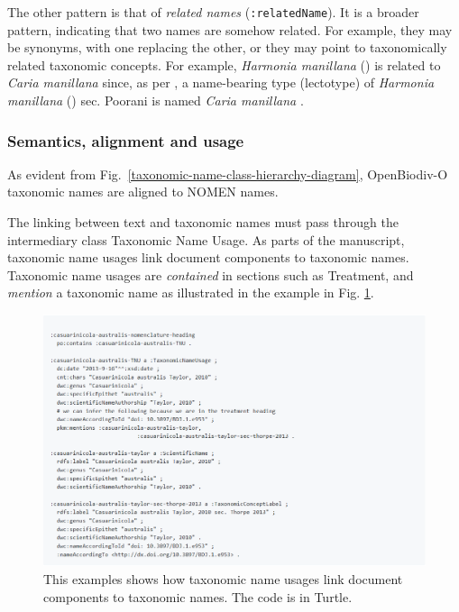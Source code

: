 The other pattern is that of \emph{related names} ({\tt :relatedName}). It is a broader pattern, indicating that two names are somehow related. For example, they may be synonyms, with one replacing the other, or they may point to taxonomically related taxonomic concepts. For example, \emph{Harmonia manillana} (\cite{mulsant_monographie_1866}) is related to \emph{Caria manillana} \cite{mulsant_monographie_1866} since, as per \cite{poorani_harmonia_2016}, a name-bearing type (lectotype) of \emph{Harmonia manillana} (\cite{mulsant_monographie_1866}) sec. Poorani \cite{poorani_harmonia_2016} is named \emph{Caria manillana} \cite{mulsant_monographie_1866}.

\subsubsection*{Semantics, alignment and usage}
As evident from Fig.~\ref{taxonomic-name-class-hierarchy-diagram}, \mbox{OpenBiodiv-O} taxonomic names are aligned to NOMEN names.

The linking between text and taxonomic names must pass through the intermediary class Taxonomic Name Usage. As parts of the manuscript, taxonomic name usages link document components to taxonomic names. Taxonomic name usages are \emph{contained} in sections such as Treatment, and \emph{mention} a taxonomic name as illustrated in the example in Fig. \ref{example-taxonomic-name-usage}.

\begin{figure}[h!]
\centering
  \includegraphics[width=\textwidth]{Figures/example-taxonomic-name-usage}
  \decoRule
  \caption[Example taxonomic name usage.]{
  This examples shows how taxonomic name usages link document components to taxonomic names. The code is in Turtle.}
  \label{example-taxonomic-name-usage}
\end{figure}

